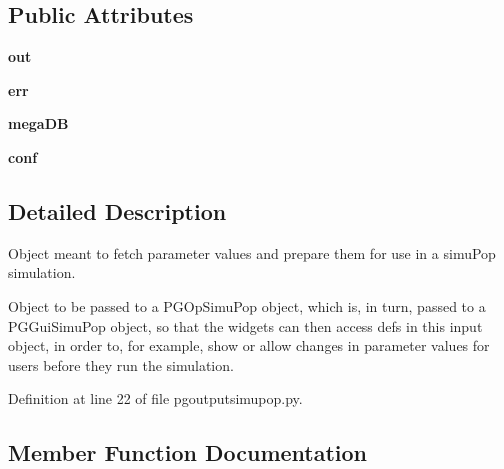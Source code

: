 \subsection*{Public Attributes}
\begin{DoxyCompactItemize}
\item 
{\bfseries out}\hypertarget{classnegui_1_1pgoutputsimupop_1_1PGOutputSimuPop_a4198008f7f7f029a29f8441ea7619170}{}\label{classnegui_1_1pgoutputsimupop_1_1PGOutputSimuPop_a4198008f7f7f029a29f8441ea7619170}

\item 
{\bfseries err}\hypertarget{classnegui_1_1pgoutputsimupop_1_1PGOutputSimuPop_a5eeccbf099cd8be3e8ab5906565d7b79}{}\label{classnegui_1_1pgoutputsimupop_1_1PGOutputSimuPop_a5eeccbf099cd8be3e8ab5906565d7b79}

\item 
{\bfseries mega\+DB}\hypertarget{classnegui_1_1pgoutputsimupop_1_1PGOutputSimuPop_a76379971c8aa1a3b175f171821b0b8f1}{}\label{classnegui_1_1pgoutputsimupop_1_1PGOutputSimuPop_a76379971c8aa1a3b175f171821b0b8f1}

\item 
{\bfseries conf}\hypertarget{classnegui_1_1pgoutputsimupop_1_1PGOutputSimuPop_ac6e385cca72ff0073251b511eea1103f}{}\label{classnegui_1_1pgoutputsimupop_1_1PGOutputSimuPop_ac6e385cca72ff0073251b511eea1103f}

\end{DoxyCompactItemize}


\subsection{Detailed Description}
\begin{DoxyVerb}Object meant to fetch parameter values and prepare them for 
use in a simuPop simulation.  

Object to be passed to a PGOpSimuPop object, which is, in turn,
passed to a PGGuiSimuPop object, so that the widgets can then access
defs in this input object, in order to, for example, show or allow
changes in parameter values for users before they run the simulation.
\end{DoxyVerb}
 

Definition at line 22 of file pgoutputsimupop.\+py.



\subsection{Member Function Documentation}
